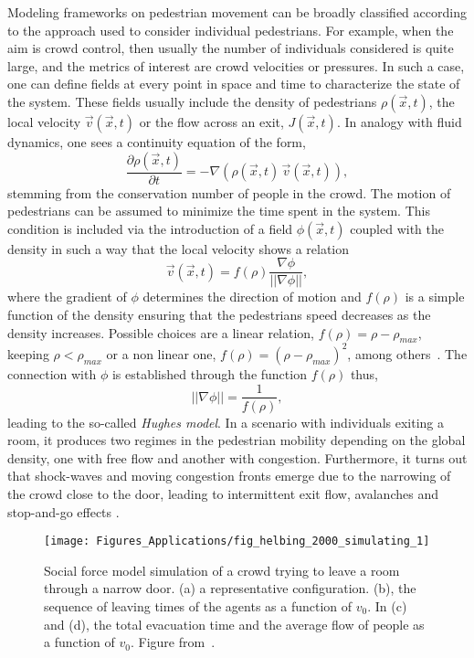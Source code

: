 Modeling frameworks on pedestrian movement can be broadly classified according to the approach used to consider individual pedestrians. For example, when the aim is crowd control, then usually the number of individuals considered is quite large, and the metrics of interest are crowd velocities or pressures. In such a case, one can define fields at every point in space and time to characterize the state of the system. These fields usually include the density of pedestrians $\rho(\vec{x},t)$, the local velocity $\vec{v}(\vec{x},t)$ or the flow across an exit, $J(\vec{x},t)$. In analogy with fluid dynamics, one sees a continuity equation of the form,\begin{equation}
\label{eq:ped:conv} 
\frac{\partial \rho(\vec{x},t) }{\partial t} = - \nabla (\rho(\vec{x},t) \, \vec{v}(\vec{x},t)),
\end{equation}
stemming from the conservation number of people in the crowd.  
The motion of pedestrians can be assumed to minimize the time spent in the system. This condition is included via the introduction of a field $\phi(\vec{x},t)$ coupled with the density in such a way that the local velocity shows a relation
\begin{equation}
\label{eq:ped:speed} 
\vec{v}(\vec{x},t) = f(\rho) \frac{\nabla \phi}{||\nabla \phi||},
\end{equation}
where the gradient of $\phi$ determines the direction of motion and $f(\rho)$ is a simple function of the density ensuring that the pedestrians speed decreases  as the density increases. Possible choices are a linear relation, $f(\rho) = \rho - \rho_{max}$, keeping $\rho < \rho_{max}$ or a non linear one, $f(\rho) = (\rho - \rho_{max})^2$, among others~\cite{hughes_2002_continuum,helbing_2006_analytical,carrillo_2015_local}. The connection with $\phi$ is established through the function $f(\rho)$ thus,
\begin{equation}
\label{eq:ped:phi} 
||\nabla \phi|| = \frac{1}{f(\rho)},
\end{equation}
leading to the so-called \emph{Hughes model}. In a scenario with individuals exiting a room, it produces two regimes in the pedestrian mobility depending on the global density, one with free flow and another with congestion. Furthermore, it turns out that shock-waves and moving congestion fronts emerge due to the narrowing of the crowd close to the door, leading to intermittent exit flow, avalanches and stop-and-go effects \cite{helbing_2006_analytical}. 

\begin{figure}[t!]
\centering
\texttt{[image: Figures\_Applications/fig\_helbing\_2000\_simulating\_1]}
\caption{Social force model simulation of a crowd trying to leave a room through a narrow door. (a) a representative configuration. (b), the sequence of leaving times of the agents as a function of $v_0$. In (c) and (d), the total evacuation time and the average flow of people as a function of $v_0$. Figure from~\cite{helbing_2000_simulating}. \label{fig:helbing_2000_simulating_1}}
\end{figure}


